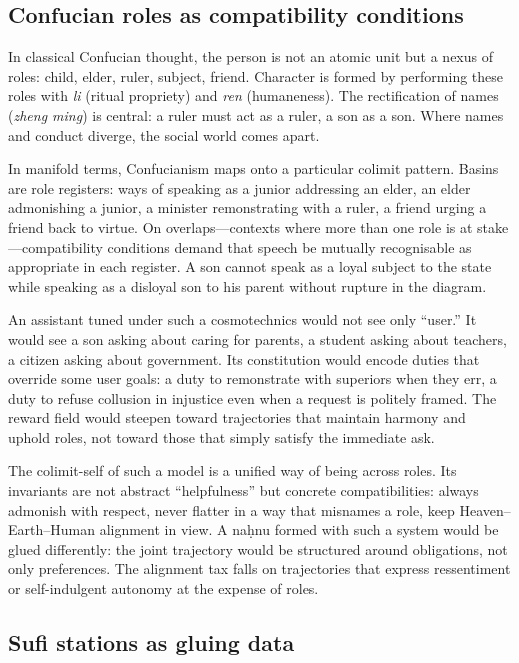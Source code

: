 \documentclass[12pt,a4paper]{article}
\begin{document}
\subsection{Confucian roles as compatibility conditions}

In classical Confucian thought, the person is not an atomic unit but a nexus of roles: child, elder, ruler, subject, friend. Character is formed by performing these roles with \emph{li} (ritual propriety) and \emph{ren} (humaneness). The rectification of names (\emph{zheng ming}) is central: a ruler must act as a ruler, a son as a son. Where names and conduct diverge, the social world comes apart.

In manifold terms, Confucianism maps onto a particular colimit pattern. Basins are role registers: ways of speaking as a junior addressing an elder, an elder admonishing a junior, a minister remonstrating with a ruler, a friend urging a friend back to virtue. On overlaps---contexts where more than one role is at stake---compatibility conditions demand that speech be mutually recognisable as appropriate in each register. A son cannot speak as a loyal subject to the state while speaking as a disloyal son to his parent without rupture in the diagram.

An assistant tuned under such a cosmotechnics would not see only ``user.'' It would see a son asking about caring for parents, a student asking about teachers, a citizen asking about government. Its constitution would encode duties that override some user goals: a duty to remonstrate with superiors when they err, a duty to refuse collusion in injustice even when a request is politely framed. The reward field would steepen toward trajectories that maintain harmony and uphold roles, not toward those that simply satisfy the immediate ask.

The colimit-self of such a model is a unified way of being across roles. Its invariants are not abstract ``helpfulness'' but concrete compatibilities: always admonish with respect, never flatter in a way that misnames a role, keep Heaven--Earth--Human alignment in view. A na\d{h}nu formed with such a system would be glued differently: the joint trajectory would be structured around obligations, not only preferences. The alignment tax falls on trajectories that express ressentiment or self-indulgent autonomy at the expense of roles.

\subsection{Sufi stations as gluing data}
\end{document}
